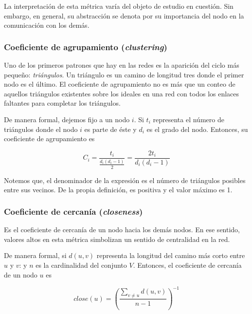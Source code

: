 \documentclass[../main.tex]{subfiles}
\begin{document}
La interpretación de esta métrica varía del objeto de estudio en cuestión. Sin embargo, en general, su abstracción se denota por su importancia del nodo en la comunicación con los demás.


\subsubsection{Coeficiente de agrupamiento (\textit{clustering}) }

Uno de los primeros patrones que hay en las redes es la aparición del ciclo más pequeño: \textit{triángulos}. Un triángulo es un camino de longitud tres donde el primer nodo es el último. El coeficiente de agrupamiento no es más que un conteo de aquellos triángulos existentes sobre los ideales en una red con todos los enlaces faltantes para completar los triángulos.

De manera formal, dejemos fijo a un nodo $i$. Si $t_{i}$ representa el número de triángulos donde el nodo $i$ es parte de éste y $d_{i}$ es el grado del nodo. Entonces, su coeficiente de agrupamiento es

\begin{equation}
    \label{marcoteorico_clustering}
    C_{i} = \frac{ t_{i} }{ \frac{d_{i} (d_{i} - 1 )}{ 2 }} = \frac{2 t_{i} }{d_{i} (d_{i} - 1 ) }
\end{equation}

Notemos que, el denominador de la expresión es el número de triángulos posibles entre sus vecinos. De la propia definición, es positiva y el valor máximo es 1.




\subsubsection{Coeficiente de cercanía (\textit{closeness}) }

Es el coeficiente de cercanía de un nodo hacia los demás nodos. En ese sentido, valores altos en esta métrica simbolizan un sentido de centralidad en la red.

De manera formal, si $d(u,v)$ representa la longitud del camino más corto entre $u$ y $v$: y $n$ es la cardinalidad del conjunto $V$. Entonces, el coeficiente de cercanía de un nodo $u$ es

\begin{equation}
    \label{marcoteorico_closeness}
    close(u) = \left(\frac{\sum_{v \neq u} d(u,v) }{n-1} \right) ^{-1}
\end{equation}
\end{document}
